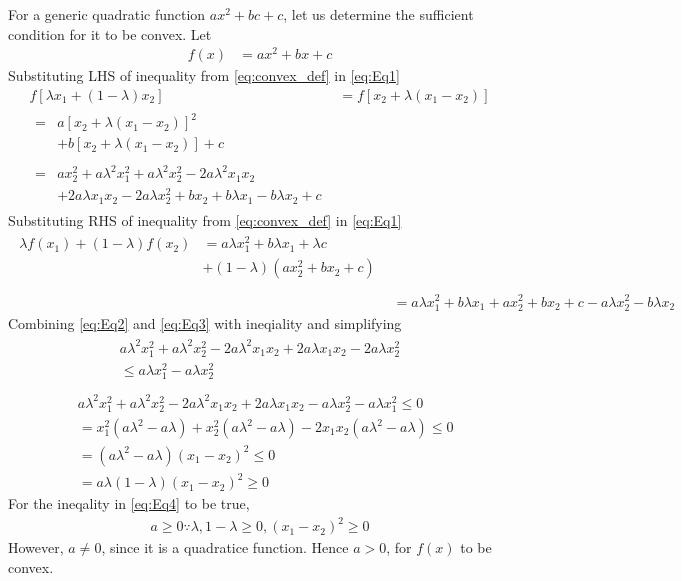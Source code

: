 \documentclass[12pt]{article}
\providecommand{\brak}[1]{\ensuremath{\left(#1\right)}}
\providecommand{\sbrak}[1]{\ensuremath{{}\left[#1\right]}}
\begin{document}
\begin{enumerate}
For a generic quadratic function $ax^2+bc+c$, let us determine the sufficient condition for it to be convex. Let 
\begin{align}
	\label{eq:Eq1}
	f\brak{x} &= ax^2+bx+c 
\end{align}
Substituting LHS of inequality from \eqref{eq:convex_def} in \eqref{eq:Eq1}
\begin{align}
	f\sbrak{\lambda x_1 + \brak{1-\lambda}x_2}  &= f\sbrak{x_2 + \lambda \brak{x_1-x_2}}\\ 
   \begin{split}
	   = {}& a\sbrak{x_2+\lambda\brak{x_1-x_2}}^2 \\ 
	     & + b\sbrak{x_2+\lambda\brak{x_1-x_2}} + c 
   \end{split} \\ 
   \label{eq:Eq2}
   \begin{split}
	   ={}& ax_2^2 + a\lambda^2 x_1^2+a\lambda^2 x_2^2 - 2a\lambda^2 x_1x_2 \\
	    & +2a\lambda x_1x_2 - 2a\lambda x_2^2+bx_2+b\lambda x_1-b\lambda x_2+c 
   \end{split} 
\end{align}
Substituting RHS of inequality from \eqref{eq:convex_def} in \eqref{eq:Eq1}
\begin{align}
	\begin{split}
	\lambda f\brak{x_1} + \brak{1-\lambda}f\brak{x_2}  &= a \lambda x_1^2 + b\lambda x_1 + \lambda c \\ 
		& + \brak{1-\lambda}\brak{ax_2^2+bx_2+c} \\
	\end{split} \\
	\label{eq:Eq3}
		&= a \lambda x_1^2 + b\lambda x_1 + ax_2^2 + bx_2 + c -a\lambda x_2^2 -b\lambda x_2
\end{align}
Combining \eqref{eq:Eq2} and \eqref{eq:Eq3} with ineqiality and simplifying
\begin{align}
	\begin{split}
	    a\lambda^2 x_1^2 + a\lambda^2 x_2^2 - 2a\lambda^2 x_1x_2 +2a\lambda x_1x_2 - 2a\lambda x_2^2 \\ 
	   \leq a\lambda x_1^2  -a\lambda x_2^2 \\ 
	\end{split} 
\end{align}
\begin{align}
	&a\lambda^2 x_1^2 + a\lambda^2 x_2^2 - 2a\lambda^2 x_1x_2 +2a\lambda x_1x_2 - a\lambda x_2^2 - a\lambda x_1^2 \leq 0 \\ 
	  &= x_1^2\brak{a\lambda^2-a\lambda} + x_2^2\brak{a\lambda^2 - a\lambda} - 2x_1x_2\brak{a\lambda^2-a\lambda} \leq 0 \\ 
	  &= \brak{a \lambda^2-a\lambda}\brak{x_1-x_2}^2 \leq 0\\
	 \label{eq:Eq4}
	  &= a\lambda\brak{1-\lambda}\brak{x_1-x_2}^2 \geq 0
\end{align}
For the ineqality in \eqref{eq:Eq4} to be true,
\begin{align}
	a \geq 0 \because \lambda, 1-\lambda \geq 0, \brak{x_1-x_2}^2 \geq 0
\end{align}
However, $a \neq 0$, since it is a quadratice function. Hence $a > 0$, for $f\brak{x}$ to be convex.


\end{enumerate}
\end{document}
